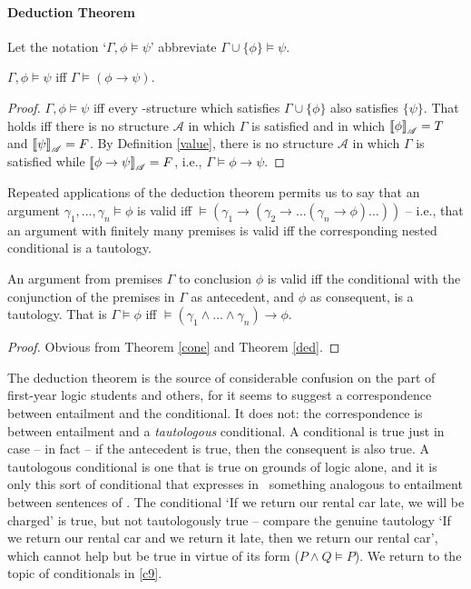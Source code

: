 \paragraph{Deduction Theorem}
	Let the notation `$\Gamma,\phi \vDash \psi$' abbreviate $\Gamma \cup\{\phi\} \vDash \psi$. \begin{theorem}[Deduction]\label{ded} $\Gamma,\phi \vDash \psi$ iff $\Gamma \vDash (\phi \to \psi)$. 
\begin{proof}
$\Gamma, \phi \vDash \psi$ iff  every \lone-structure which satisfies $\Gamma\cup\{\phi\}$ also satisfies $\{\psi\}$. That holds iff there is no structure $\mathscr{A}$ in which $\Gamma$ is satisfied and in which $\left\llbracket \phi\right\rrbracket_{\mathscr{A}}=T$ and $\left\llbracket \psi\right\rrbracket_{\mathscr{A}}=F$. By Definition \ref{value}, there is no structure $\mathscr{A}$ in which $\Gamma$ is satisfied while $\left\llbracket \phi\to\psi\right\rrbracket_{\mathscr{A}}=F$, i.e., $\Gamma\vDash\phi\to\psi$.
\end{proof}
\end{theorem}
Repeated applications of the deduction theorem permits us to say that an argument $\gamma_{1},\ldots,\gamma_{n} \vDash \phi$ is valid iff $\vDash (\gamma_{1} \to (\gamma_{2} \to …(\gamma_{n}\to \phi)…))$ – i.e., that an argument with finitely many premises is valid iff the corresponding nested conditional is a tautology.\begin{corol}
	An argument from premises $\Gamma$ to conclusion $\phi$ is valid iff the conditional with the conjunction of the premises in $\Gamma$ as antecedent, and $\phi$ as consequent, is a tautology. That is $\Gamma\vDash\phi$ iff $\vDash (\gamma_{1}\wedge\ldots\wedge\gamma_{n}) \to \phi$. \begin{proof}
		Obvious from Theorem \ref{cone} and Theorem \ref{ded}.
	\end{proof}
\end{corol} The deduction theorem is the source of considerable confusion on the part of first-year logic students and others, for it seems to suggest a correspondence between entailment and the conditional. It does not: the correspondence is between entailment and a \emph{tautologous} conditional. A conditional is true just in case – in fact – if the antecedent is true, then the consequent is also true. A tautologous conditional is one that is true on grounds of logic alone, and it is only this sort of conditional that expresses in \lone\ something analogous to entailment between sentences of \lone. The conditional `If we return our rental car late, we will be charged' is true, but not tautologously true – compare the genuine tautology `If we return our rental car and we return it late, then we return our rental car', which cannot help but be true in virtue of its form ($P\wedge Q \vDash P$). We return to the topic of conditionals in \autoref{c9}.




